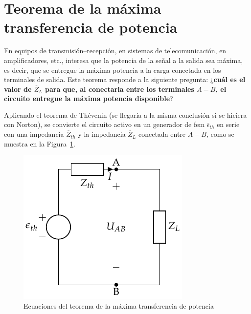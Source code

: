     
    
    
    

\section{Teorema de la máxima transferencia de potencia}
\label{sec:teorema-max_potencia}

En equipos de transmisión--recepción, en sistemas de telecomunicación,
en amplificadores, etc., interesa que la potencia de la señal a la
salida sea máxima, es decir, que se entregue la máxima potencia a la
carga conectada en los terminales de salida.  Este teorema responde a
la siguiente pregunta: ¿\textbf{cuál es el valor de $\overline{Z}_L$ para que,
  al conectarla entre los terminales $A-B$, el circuito entregue la
  máxima potencia disponible}?

Aplicando el teorema de Thévenin (se llegaría a la misma conclusión si
se hiciera con Norton), se convierte el circuito activo en un
generador de fem $\overline{\epsilon}_{th}$ en serie con una
impedancia $\overline{Z}_{th}$ y la impedancia $\overline{Z}_L$
conectada entre $A-B$, como se muestra en la
Figura~\ref{fig:equivalenteThevenin0_ca}.
\begin{figure}[H]
  \centering \includegraphics{../figs/EquivalenteThevenin0.pdf}
  \caption{Ecuaciones del teorema de la máxima transferencia de
    potencia}
  \label{fig:equivalenteThevenin0_ca}
\end{figure}

